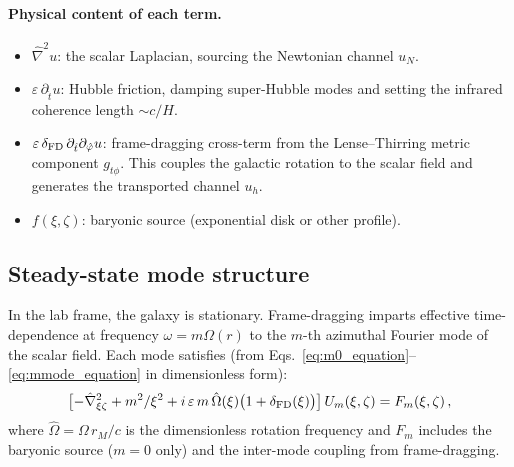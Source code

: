\documentclass[11pt]{article}
\begin{document}
\paragraph{Physical content of each term.}
\begin{itemize}
\item $\hat\nabla^{2}u$: the scalar Laplacian, sourcing the
  Newtonian channel $u_N$.
\item $\varepsilon\,\partial_{\hat t}u$: Hubble friction,
  damping super-Hubble modes and setting the infrared
  coherence length $\sim c/H$.
\item $\varepsilon\,\delta_{\rm FD}\,
  \partial_{\hat t}\partial_{\hat\phi}u$:
  frame-dragging cross-term from the Lense--Thirring
  metric component $g_{t\phi}$.
  This couples the galactic rotation to the scalar field
  and generates the transported channel $u_h$.
\item $f(\xi,\zeta)$: baryonic source (exponential disk or
  other profile).
\end{itemize}

\subsection{Steady-state mode structure}
\label{sec:mode_structure}

In the lab frame, the galaxy is stationary.
Frame-dragging imparts effective time-dependence at frequency
$\omega = m\Omega(r)$ to the $m$-th azimuthal Fourier mode
of the scalar field.  Each mode satisfies
(from Eqs.~\eqref{eq:m0_equation}--\eqref{eq:mmode_equation}
in dimensionless form):
\begin{equation}
\bigl[-\hat\nabla_{\xi\zeta}^{2}
 + m^{2}/\xi^{2}
 + i\,\varepsilon\,m\,\hat\Omega(\xi)
 \bigl(1+\delta_{\rm FD}(\xi)\bigr)\bigr]\,
 U_m(\xi,\zeta)
= F_m(\xi,\zeta)\,,
\label{eq:mode_eq}
\end{equation}
where $\hat\Omega = \Omega\,r_M/c$ is the dimensionless
rotation frequency and $F_m$ includes the baryonic source
($m=0$ only) and the inter-mode coupling from
frame-dragging.
\end{document}
